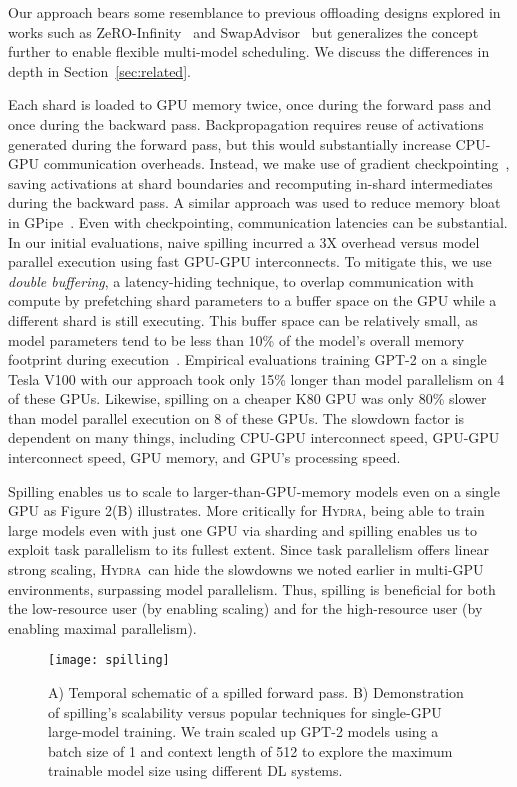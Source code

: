 \documentclass{article}
\newcommand{\system}{\textsc{Hydra}}
\begin{document}
Our approach bears some resemblance to previous offloading designs explored in works such as ZeRO-Infinity~\cite{zeroInfinity} and SwapAdvisor~\cite{huang2020swapadvisor} but generalizes the concept further to enable flexible multi-model scheduling. We discuss the differences in depth in Section~\ref{sec:related}. 

Each shard is loaded to GPU memory twice, once during the forward pass and once during the backward pass. Backpropagation requires reuse of activations generated during the forward pass, but this would substantially increase CPU-GPU communication overheads. Instead, we make use of gradient checkpointing~\cite{chen2016training}, saving activations at shard boundaries and recomputing in-shard intermediates during the backward pass. A similar approach was used to reduce memory bloat in GPipe~\cite{gpipe}. 
Even with checkpointing, communication latencies can be substantial. In our initial evaluations, naive spilling incurred a 3X overhead versus model parallel execution using fast GPU-GPU interconnects. To mitigate this, we use \textit{double buffering}, a latency-hiding technique, to overlap communication with compute by prefetching shard parameters to a buffer space on the GPU while a different shard is still executing. This buffer space can be relatively small, as model parameters tend to be less than 10\% of the model's overall memory footprint during execution~\cite{gpipe, zeroOpt, l2l}. Empirical evaluations training GPT-2 on a single Tesla V100 with our approach took only 15\% longer than model parallelism on 4 of these GPUs. Likewise, spilling on a cheaper K80 GPU was only 80\% slower than model parallel execution on 8 of these GPUs. The slowdown factor is dependent on many things, including CPU-GPU interconnect speed, GPU-GPU interconnect speed, GPU memory, and GPU's processing speed.

Spilling enables us to scale to larger-than-GPU-memory models even on a single GPU as Figure 2(B) illustrates. More critically for \system, being able to train large models even with just one GPU via sharding and spilling enables us to exploit task parallelism to its fullest extent. Since task parallelism offers linear strong scaling, \system~can hide the slowdowns we noted earlier in multi-GPU environments, surpassing model parallelism. Thus, spilling is beneficial for both the low-resource user (by enabling scaling) and for the high-resource user (by enabling maximal parallelism).

\begin{figure}
 \label{fig:spilling}
  \centering
  \texttt{[image: spilling]}
  \caption{A) Temporal schematic of a spilled forward pass. B) Demonstration of spilling's scalability versus popular techniques for single-GPU large-model training. We train scaled up GPT-2 models using a batch size of 1 and context length of 512 to explore the maximum trainable model size using different DL systems.}

\end{figure}
\end{document}
